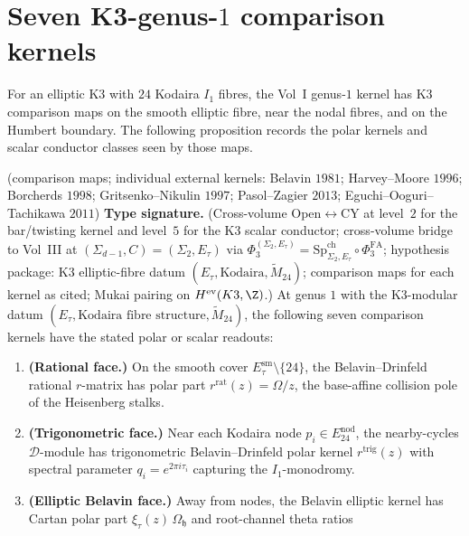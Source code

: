 \section{Seven K3-genus-$1$ comparison kernels}
\label{sec:g1sf-supplement-ii}

For an elliptic K3 with $24$ Kodaira $I_1$ fibres, the Vol~I
genus-$1$ kernel has K3 comparison maps on the smooth elliptic fibre,
near the nodal fibres, and on the Humbert boundary. The following
proposition records the polar kernels and scalar conductor classes
seen by those maps.

\begin{proposition}
\label{prop:g1sf-seven-K3-faces}
\ClaimStatusConditional{} \textup{(}comparison maps; individual
external kernels:
Belavin $1981$; Harvey--Moore $1996$; Borcherds $1998$;
Gritsenko--Nikulin $1997$; Pasol--Zagier $2013$; Eguchi--Ooguri--Tachikawa
$2011$\textup{)}
\textbf{Type signature.} (Cross-volume Open$\leftrightarrow$CY at
level~$2$ for the bar/twisting kernel and level~$5$ for the K3
scalar conductor; cross-volume bridge to Vol~III at
$(\Sigma_{d-1}, C) = (\Sigma_2, E_\tau)$ via
$\Phi_3^{(\Sigma_2,E_\tau)} = \mathrm{Sp}^{\mathrm{ch}}_{\Sigma_2,E_\tau}\circ
\Phi_3^{\mathrm{FA}}$; hypothesis package: K3 elliptic-fibre datum
$(E_\tau,\text{Kodaira},\widetilde{M}_{24})$; comparison maps for
each kernel as cited; Mukai pairing on $H^{\mathrm{ev}}(K3,\Z)$.)
At genus $1$ with the K3-modular datum $(E_\tau, \text{Kodaira fibre
structure}, \widetilde{M}_{24})$, the following seven comparison
kernels have the stated polar or scalar readouts:
\begin{enumerate}
\item \textbf{(Rational face.)} On the smooth cover
$E_\tau^{\mathrm{sm}}\setminus\{24\}$, the Belavin--Drinfeld rational
$r$-matrix has polar part $r^{\mathrm{rat}}(z)=\Omega/z$, the
base-affine collision pole of the Heisenberg stalks.
\item \textbf{(Trigonometric face.)} Near each Kodaira node
$p_i \in E^{\mathrm{nod}}_{24}$, the nearby-cycles $\mathcal{D}$-module
has trigonometric Belavin--Drinfeld polar kernel $r^{\mathrm{trig}}(z)$
with spectral parameter $q_i = e^{2\pi i\tau_i}$ capturing the
$I_1$-monodromy.
\item \textbf{(Elliptic Belavin face.)} Away from nodes, the
Belavin elliptic kernel has Cartan polar part
$\xi_\tau(z)\,\Omega_{\mathfrak h}$ and root-channel theta ratios

\end{enumerate}
\end{proposition}
